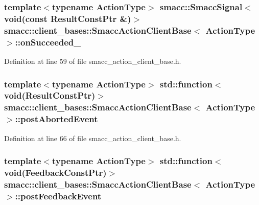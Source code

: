 \subsubsection[{\texorpdfstring{on\+Succeeded\+\_\+}{onSucceeded_}}]{\setlength{\rightskip}{0pt plus 5cm}template$<$typename Action\+Type$>$ {\bf smacc\+::\+Smacc\+Signal}$<$void(const Result\+Const\+Ptr \&)$>$ {\bf smacc\+::client\+\_\+bases\+::\+Smacc\+Action\+Client\+Base}$<$ Action\+Type $>$\+::on\+Succeeded\+\_\+}\hypertarget{classsmacc_1_1client__bases_1_1SmaccActionClientBase_afa1d615e16c9e825d815a3a3ccaa61df}{}\label{classsmacc_1_1client__bases_1_1SmaccActionClientBase_afa1d615e16c9e825d815a3a3ccaa61df}


Definition at line 59 of file smacc\+\_\+action\+\_\+client\+\_\+base.\+h.

\subsubsection[{\texorpdfstring{post\+Aborted\+Event}{postAbortedEvent}}]{\setlength{\rightskip}{0pt plus 5cm}template$<$typename Action\+Type$>$ std\+::function$<$void(Result\+Const\+Ptr)$>$ {\bf smacc\+::client\+\_\+bases\+::\+Smacc\+Action\+Client\+Base}$<$ Action\+Type $>$\+::post\+Aborted\+Event}\hypertarget{classsmacc_1_1client__bases_1_1SmaccActionClientBase_a9ca2952ededeec233ee6d8a9a39c680b}{}\label{classsmacc_1_1client__bases_1_1SmaccActionClientBase_a9ca2952ededeec233ee6d8a9a39c680b}


Definition at line 66 of file smacc\+\_\+action\+\_\+client\+\_\+base.\+h.

\subsubsection[{\texorpdfstring{post\+Feedback\+Event}{postFeedbackEvent}}]{\setlength{\rightskip}{0pt plus 5cm}template$<$typename Action\+Type$>$ std\+::function$<$void(Feedback\+Const\+Ptr)$>$ {\bf smacc\+::client\+\_\+bases\+::\+Smacc\+Action\+Client\+Base}$<$ Action\+Type $>$\+::post\+Feedback\+Event}\hypertarget{classsmacc_1_1client__bases_1_1SmaccActionClientBase_ac754fb0adfc982fe1adde0d92842a33b}{}\label{classsmacc_1_1client__bases_1_1SmaccActionClientBase_ac754fb0adfc982fe1adde0d92842a33b}


